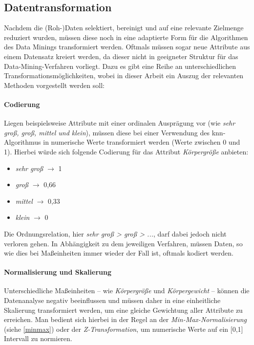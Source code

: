 \subsection{Datentransformation}
\label{dt}
Nachdem die (Roh-)Daten selektiert, bereinigt und auf eine relevante Zielmenge reduziert wurden, müssen diese noch in eine adaptierte Form für die Algorithmen des Data Minings transformiert werden. Oftmals müssen sogar neue Attribute aus einem Datensatz kreiert werden, da dieser nicht in geeigneter Struktur für das Data-Mining-Verfahren vorliegt. Dazu es gibt eine Reihe an unterschiedlichen Transformationsmöglichkeiten, wobei in dieser Arbeit ein Auszug der relevanten Methoden vorgestellt werden soll:

\paragraph{Codierung}
Liegen beispielsweise Attribute mit einer ordinalen Ausprägung vor (wie \textit{sehr groß, groß, mittel und klein}), müssen diese bei einer Verwendung des \gls{knn}-Algorithmus in numerische Werte transformiert werden (Werte zwischen 0 und 1). Hierbei würde sich folgende Codierung für das Attribut \textit{Körpergröße} anbieten:

\begin{itemize}
\item \textit{sehr groß} $\rightarrow$ 1
\item \textit{groß} $\rightarrow$ 0,66
\item \textit{mittel} $\rightarrow$ 0,33
\item \textit{klein} $\rightarrow$ 0
\end{itemize}

Die Ordnungsrelation, hier \textit{sehr groß > groß > ...}, darf dabei jedoch nicht verloren gehen. In Abhängigkeit zu dem jeweiligen Verfahren, müssen Daten, so wie dies bei Maßeinheiten immer wieder der Fall ist, oftmals kodiert werden.

\paragraph{Normalisierung und Skalierung}
Unterschiedliche Maßeinheiten -- wie \textit{Körpergröße} und \textit{Körpergewicht} -- können die Datenanalyse negativ beeinflussen und müssen daher in eine einheitliche Skalierung transformiert werden, um eine gleiche Gewichtung aller Attribute zu erreichen. Man bedient sich hierbei in der Regel an der \textit{Min-Max-Normalisierung} (siehe \vref{minmax}) oder der \textit{Z-Transformation}, um numerische Werte auf ein [0,1] Intervall zu normieren.

